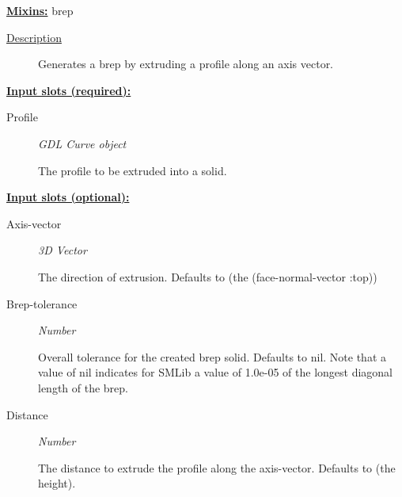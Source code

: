 \documentclass [11pt]{book}
\begin{document}
\begin{itemize}
\textbf{
\underline{Mixins:}} brep





\begin{description}

\item [
\underline{Description}]


Generates a brep by extruding a profile along an axis vector.



\end{description}








\textbf{
\underline{Input slots (required):}}

\begin{description}

\item [Profile]
\emph{GDL Curve object}

 The profile to be extruded into a solid.




\end{description}






\textbf{
\underline{Input slots (optional):}}

\begin{description}

\item [Axis-vector]
\emph{3D Vector}

 The direction of extrusion. Defaults
to (the (face-normal-vector :top))




\item [Brep-tolerance]
\emph{Number}

 Overall tolerance for the created brep solid. Defaults to nil.
Note that a value of nil indicates for SMLib a value of 1.0e-05 of the longest diagonal
length of the brep.




\item [Distance]
\emph{Number}

 The distance to extrude the profile along the axis-vector.
Defaults to (the height).





\end{description}
\end{itemize}
\end{document}
